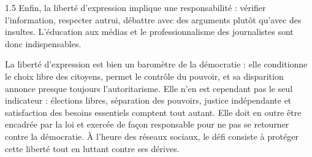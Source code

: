 \documentclass[12pt]{article}
\begin{document}
\begin{spacing}{1.5}
Enfin, la liberté d'expression implique une responsabilité : vérifier l'information, respecter autrui, débattre avec des arguments plutôt qu'avec des insultes. L'éducation aux médias et le professionnalisme des journalistes sont donc indispensables.


La liberté d'expression est bien un baromètre de la démocratie : elle conditionne le choix libre des citoyens, permet le contrôle du pouvoir, et sa disparition annonce presque toujours l'autoritarisme. Elle n'en est cependant pas le seul indicateur : élections libres, séparation des pouvoirs, justice indépendante et satisfaction des besoins essentiels comptent tout autant. Elle doit en outre être encadrée par la loi et exercée de façon responsable pour ne pas se retourner contre la démocratie. À l'heure des réseaux sociaux, le défi consiste à protéger cette liberté tout en luttant contre ses dérives.

\end{spacing}
\end{document}
